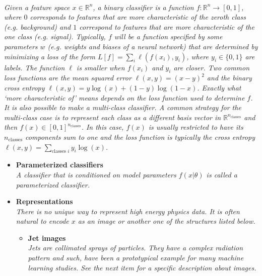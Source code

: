 \documentclass[12pt,letterpaper]{article}
\begin{document}
\begin{itemize}
\\\textit{Given a feature space $x\in\mathbb{R}^n$, a binary classifier is a function $f:\mathbb{R}^n\rightarrow [0,1]$, where $0$ corresponds to features that are more characteristic of the zeroth class (e.g. background) and $1$ correspond to features that are more characteristic of the one class (e.g. signal).  Typically, $f$ will be a function specified by some parameters $w$ (e.g. weights and biases of a neural network) that are determined by minimizing a loss of the form $L[f]=\sum_{i}\ell(f(x_i),y_i)$, where $y_i\in\{0,1\}$ are labels.  The function $\ell$ is smaller when $f(x_i)$ and $y_i$ are closer.  Two common loss functions are the mean squared error $\ell(x,y)=(x-y)^2$ and the binary cross entropy $\ell(x,y)=y\log(x)+(1-y)\log(1-x)$.  Exactly what `more characteristic of' means depends on the loss function used to determine $f$.  It is also possible to make a multi-class classifier.  A common strategy for the multi-class case is to represent each class as a different basis vector in $\mathbb{R}^{n_\text{classes}}$ and then $f(x)\in[0,1]^{n_\text{classes}}$.  In this case, $f(x)$ is usually restricted to have its $n_\text{classes}$ components sum to one and the loss function is typically the cross entropy $\ell(x,y)=\sum_\text{classes $i$} y_i\log(x)$.}
	\begin{itemize}
		\item \textbf{Parameterized classifiers}~\cite{Aguilar-Saavedra:2025zgs,Chen:2023ind,Nachman:2021yvi,Cranmer:2015bka,Baldi:2016fzo}
		\\\textit{A classifier that is conditioned on model parameters $f(x|\theta)$ is called a parameterized classifier.}
		\item \textbf{Representations}
			\\\textit{There is no unique way to represent high energy physics data.  It is often natural to encode $x$ as an image or another one of the structures listed below.}
			\begin{itemize}
				\item \textbf{Jet images}~\cite{Kim:2026rjk,Baruah:2025vpe,Jang:2025guj,Li:2025tqr,Bassa:2025qru,Qureshi:2025ylv,Kheddar:2024osf,Han:2023djl,Choi:2023slq,Filipek:2021qbe,Du:2020pmp,collado2021learning,Lee:2019cad,li2020attention,li2020reconstructing,Macaluso:2018tck,Kasieczka:2017nvn,Komiske:2016rsd,Barnard:2016qma,Komiske:2018oaa,Lin:2018cin,ATL-PHYS-PUB-2017-017,deOliveira:2015xxd,Almeida:2015jua,Cogan:2014oua,Pumplin:1991kc}
				\\\textit{Jets are collimated sprays of particles.  They have a complex radiation pattern and such, have been a prototypical example for many machine learning studies.  See the next item for a specific description about images.}

\end{itemize}
\end{itemize}
\end{itemize}
\end{document}
